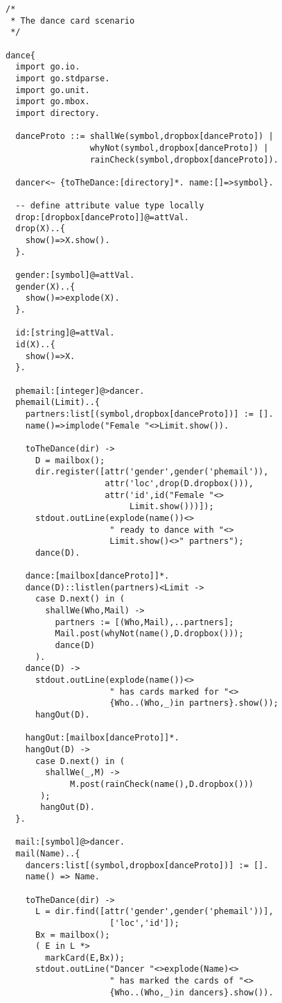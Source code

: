 \begin{verbatim}
/*
 * The dance card scenario
 */
 
dance{
  import go.io.
  import go.stdparse.
  import go.unit.
  import go.mbox.
  import directory.
  
  danceProto ::= shallWe(symbol,dropbox[danceProto]) | 
                 whyNot(symbol,dropbox[danceProto]) | 
                 rainCheck(symbol,dropbox[danceProto]).
  
  dancer<~ {toTheDance:[directory]*. name:[]=>symbol}.

  -- define attribute value type locally
  drop:[dropbox[danceProto]]@=attVal.
  drop(X)..{
    show()=>X.show().
  }.

  gender:[symbol]@=attVal.
  gender(X)..{
    show()=>explode(X).
  }.

  id:[string]@=attVal.
  id(X)..{
    show()=>X.
  }.

  phemail:[integer]@>dancer.
  phemail(Limit)..{
    partners:list[(symbol,dropbox[danceProto])] := [].
    name()=>implode("Female "<>Limit.show()).

    toTheDance(dir) ->
      D = mailbox();
      dir.register([attr('gender',gender('phemail')),
                    attr('loc',drop(D.dropbox())),
                    attr('id',id("Female "<>
                         Limit.show()))]);
      stdout.outLine(explode(name())<>
                     " ready to dance with "<>
                     Limit.show()<>" partners");
      dance(D).

    dance:[mailbox[danceProto]]*.
    dance(D)::listlen(partners)<Limit ->
      case D.next() in (
        shallWe(Who,Mail) ->
          partners := [(Who,Mail),..partners];
          Mail.post(whyNot(name(),D.dropbox()));
          dance(D)
      ).
    dance(D) -> 
      stdout.outLine(explode(name())<>
                     " has cards marked for "<>
                     {Who..(Who,_)in partners}.show());
      hangOut(D).

    hangOut:[mailbox[danceProto]]*.
    hangOut(D) ->
      case D.next() in (
        shallWe(_,M) ->
             M.post(rainCheck(name(),D.dropbox()))
       );
       hangOut(D).
  }.
  
  mail:[symbol]@>dancer.
  mail(Name)..{
    dancers:list[(symbol,dropbox[danceProto])] := [].
    name() => Name.
    
    toTheDance(dir) ->
      L = dir.find([attr('gender',gender('phemail'))],
                     ['loc','id']);
      Bx = mailbox();
      ( E in L *>
        markCard(E,Bx));
      stdout.outLine("Dancer "<>explode(Name)<>
                     " has marked the cards of "<> 
                     {Who..(Who,_)in dancers}.show()).


\end{verbatim}

